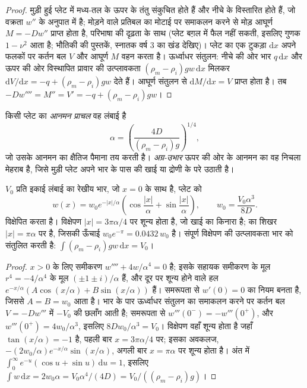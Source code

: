 \begin{proof}
मुड़ी हुई प्लेट में मध्य-तल के ऊपर के तंतु संकुचित होते हैं और नीचे के
विस्तारित होते हैं, जो वक्रता $w''$ के अनुपात में है; मोड़ने वाले प्रतिबल का
मोटाई पर समाकलन करने से मोड़ आघूर्ण $M = -Dw''$ प्राप्त होता है, परिभाषा की दृढ़ता के साथ
(प्लेट बग़ल में फैल नहीं सकती, इसलिए गुणक
$1 - \nu^2$ आता है; भौतिकी की पुस्तकें, स्नातक वर्ष 3 का खंड देखिए)। प्लेट का एक टुकड़ा $\mathrm dx$
अपने फलकों पर कर्तन बल $V$ और आघूर्ण $M$ वहन करता है। ऊर्ध्वाधर संतुलन:
नीचे की ओर भार $q\,\mathrm dx$ और ऊपर की ओर विस्थापित प्रावार की उत्प्लावकता
$(\rho_m - \rho_i)gw\,\mathrm dx$ मिलकर $\mathrm dV/\mathrm dx = -q +
(\rho_m - \rho_i)gw$ देते हैं। आघूर्ण संतुलन से $\mathrm dM/\mathrm dx = V$ प्राप्त होता है।
तब $-Dw'''' = M'' = V' = -q + (\rho_m - \rho_i)gw$।
\end{proof}

\begin{definition}[आनमन प्राचल, अग्र-उभार]\label{def:b3:gravity-geodesy:alpha}
किसी प्लेट का \emph{आनमन प्राचल} वह
लंबाई है
\[
  \alpha = \left(\frac{4D}{(\rho_m - \rho_i)g}\right)^{1/4},
\]
जो उसके आनमन का क्षैतिज पैमाना तय करती है। \emph{अग्र-उभार}
ऊपर की ओर के आनमन का वह निचला मेहराब है, जिसे मुड़ी प्लेट अपने भार के पास की खाई या
द्रोणी के परे उठाती है।
\end{definition}

\begin{proposition}[सतत प्लेट पर रेखीय भार]\label{prop:b3:gravity-geodesy:line}
$V_0$ प्रति इकाई लंबाई का रेखीय भार, जो $x = 0$ के साथ है, प्लेट को
\[
  w(x) = w_0e^{-|x|/\alpha}\left(\cos\frac{|x|}{\alpha} + \sin\frac{|x|}{\alpha}\right),
  \qquad w_0 = \frac{V_0\alpha^3}{8D} .
\]
विक्षेपित करता है। विक्षेपण $|x| = 3\pi\alpha/4$ पर शून्य होता है, जो खाई का किनारा है;  का
शिखर $|x| = \pi\alpha$ पर है, जिसकी ऊँचाई $w_0e^{-\pi} =
\num{0.0432}\,w_0$ है। संपूर्ण विक्षेपण की उत्प्लावकता भार को संतुलित करती है:
$\int(\rho_m - \rho_i)gw\,\mathrm dx = V_0$।
\end{proposition}

\begin{proof}
$x > 0$ के लिए समीकरण $w'''' + 4w/\alpha^4 = 0$ है; इसके सहायक समीकरण के मूल
$r^4 = -4/\alpha^4$ के मूल $(\pm1 \pm i)/\alpha$ हैं, और दूर पर शून्य होने वाले हल
$e^{-x/\alpha}(A\cos(x/\alpha) + B\sin(x/\alpha))$ हैं। समरूपता से
$w'(0) = 0$ का नियम बनता है, जिससे $A = B = w_0$ आता है। भार के पार ऊर्ध्वाधर संतुलन का समाकलन करने पर
कर्तन बल $V = -Dw'''$ में $-V_0$ की छलाँग आती है; समरूपता से
$w'''(0^-) = -w'''(0^+)$, और $w'''(0^+) = 4w_0/\alpha^3$, इसलिए $8Dw_0/\alpha^3 =
V_0$। विक्षेपण वहाँ शून्य होता है जहाँ $\tan(x/\alpha) =
-1$ है, पहली बार $x = 3\pi\alpha/4$ पर; इसका अवकलज,
$-(2w_0/\alpha)e^{-x/\alpha}\sin(x/\alpha)$, अगली बार $x = \pi\alpha$ पर शून्य होता है।
अंत में $\int_0^\infty e^{-u}(\cos u + \sin u)\,\mathrm du = 1$, इसलिए
$\int w\,\mathrm dx = 2w_0\alpha = V_0\alpha^4/(4D) = V_0/((\rho_m - \rho_i)g)$।
\end{proof}

